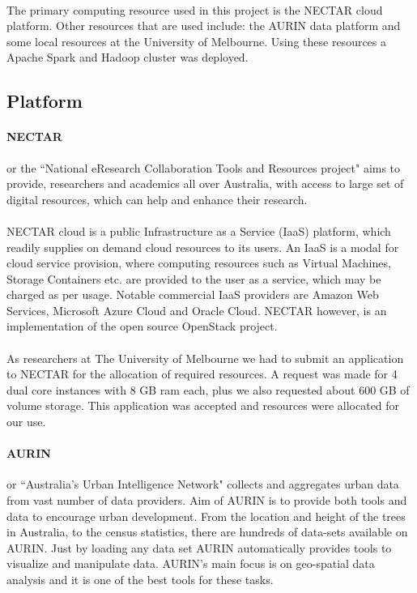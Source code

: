 \documentclass[12pt]{report}
\theoremstyle{named}
\begin{document}
\paragraph{}
The primary computing resource used in this project is the NECTAR\cite{NECTAR} cloud platform. Other resources that are used include: the AURIN\cite{AURIN} data platform and some local resources at the University of Melbourne. Using these resources a Apache Spark and Hadoop cluster was deployed.

\subsection{Platform}
\paragraph{NECTAR} or the ``National eResearch Collaboration Tools and Resources project" aims to provide, researchers and academics all over Australia, with access to large set of digital resources, which can help and enhance their research. 
\paragraph{}
NECTAR cloud is a public Infrastructure as a Service (IaaS) platform, which readily supplies on demand cloud resources to its users. An IaaS is a modal for cloud service provision, where computing resources such as Virtual Machines, Storage Containers etc. are provided to the user as a service, which may be charged as per usage. Notable commercial IaaS providers are Amazon Web Services\cite{AWS}, Microsoft Azure Cloud\cite{Azure} and Oracle Cloud\cite{OracleCloud}. NECTAR however, is an implementation of the open source OpenStack\cite{OpenStack} project.
\paragraph{}
As researchers at The University of Melbourne we had to submit an application to NECTAR for the allocation of required resources. A request was made for 4 dual core instances with 8 GB ram each, plus we also requested about 600 GB of volume storage. This application was accepted and resources were allocated for our use.

\paragraph{AURIN} or ``Australia’s Urban Intelligence Network" collects and aggregates urban data from vast number of data providers. Aim of AURIN is to provide both tools and data to encourage urban development. From the location and height of the trees in Australia, to the census statistics, there are hundreds of data-sets available on AURIN. Just by loading any data set AURIN automatically provides tools to visualize and manipulate data. AURIN's main focus is on geo-spatial data analysis and it is one of the best tools for these tasks.
\end{document}
